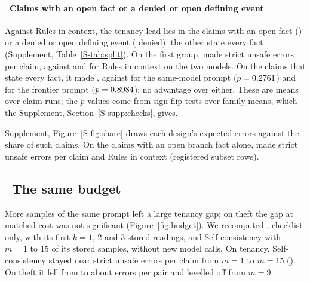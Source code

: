 \paragraph{\dag\ Claims with an open fact or a denied or open defining event}
Against Rules in context, the tenancy lead lies in the \sthreeFOneClaimsO{} claims with an open fact (\sthreeFOneClaimsOOpenFact) or a denied or open defining event (\sthreeFOneClaimsODenied{} denied); the other \sthreeFOneClaimsS{} state every fact (Supplement, Table~\ref{S-tab:split}). On the first group, \casepath made \sthreeFOneCasePathOStrictClaimRun{} strict unsafe errors per claim, against \sthreeFOneRicOStrictClaimRun{} and \sthreeFOneRicFrontierOStrictClaimRun{} for Rules in context on the two models. On the claims that state every fact, it made \sthreeFOneCasePathSStrictClaimRun, against \sthreeFOneRicSStrictClaimRun{} for the same-model prompt ($p=0.2761$) and \sthreeFOneRicFrontierSStrictClaimRun{} for the frontier prompt ($p=0.8984$): no advantage over either. These are means over claim-runs; the $p$ values come from sign-flip tests over family means, which the Supplement, Section~\ref{S-supp:checks}, gives.

Supplement, Figure~\ref{S-fig:share} draws each design's expected errors against the share of such claims. On the \sthreeClaimsOpenBranch{} claims with an open branch fact alone, \casepath made \sthreeCasePathOpenBranchStrict{} strict unsafe errors per claim and Rules in context \sthreeRicOpenBranchStrict{} (registered subset rows).

\subsection{\dag\ The same budget}
\label{sec:test-budget}

More samples of the same prompt left a large tenancy gap; on theft the gap at matched cost was not significant (Figure~\ref{fig:budget}). We recomputed \casepath, checklist only, with its first $k=1$, 2 and 3 stored readings, and Self-consistency with $m=1$ to 15 of its stored samples, without new model calls. On tenancy, Self-consistency stayed near \sthreeFFourTenMOneErrors{} strict unsafe errors per claim from $m=1$ to $m=15$ (\sthreeFFourTenMFifteenErrors). On theft it fell from \sthreeFFourThMOneErrors{} to about \sthreeFFourThMThirteenErrors{} errors per pair and levelled off from $m=9$.

